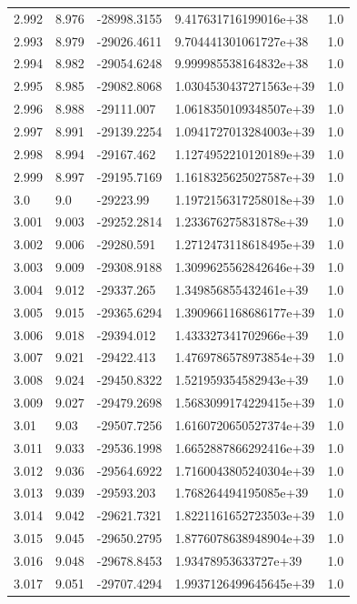 \begin{tabular}{lllll}
2.992 & 8.976 & -28998.3155 & 9.417631716199016e+38 & 1.0 \\
2.993 & 8.979 & -29026.4611 & 9.704441301061727e+38 & 1.0 \\
2.994 & 8.982 & -29054.6248 & 9.999985538164832e+38 & 1.0 \\
2.995 & 8.985 & -29082.8068 & 1.0304530437271563e+39 & 1.0 \\
2.996 & 8.988 & -29111.007 & 1.0618350109348507e+39 & 1.0 \\
2.997 & 8.991 & -29139.2254 & 1.0941727013284003e+39 & 1.0 \\
2.998 & 8.994 & -29167.462 & 1.1274952210120189e+39 & 1.0 \\
2.999 & 8.997 & -29195.7169 & 1.1618325625027587e+39 & 1.0 \\
3.0 & 9.0 & -29223.99 & 1.1972156317258018e+39 & 1.0 \\
3.001 & 9.003 & -29252.2814 & 1.233676275831878e+39 & 1.0 \\
3.002 & 9.006 & -29280.591 & 1.2712473118618495e+39 & 1.0 \\
3.003 & 9.009 & -29308.9188 & 1.3099625562842646e+39 & 1.0 \\
3.004 & 9.012 & -29337.265 & 1.349856855432461e+39 & 1.0 \\
3.005 & 9.015 & -29365.6294 & 1.3909661168686177e+39 & 1.0 \\
3.006 & 9.018 & -29394.012 & 1.433327341702966e+39 & 1.0 \\
3.007 & 9.021 & -29422.413 & 1.4769786578973854e+39 & 1.0 \\
3.008 & 9.024 & -29450.8322 & 1.521959354582943e+39 & 1.0 \\
3.009 & 9.027 & -29479.2698 & 1.5683099174229415e+39 & 1.0 \\
3.01 & 9.03 & -29507.7256 & 1.6160720650527374e+39 & 1.0 \\
3.011 & 9.033 & -29536.1998 & 1.6652887866292416e+39 & 1.0 \\
3.012 & 9.036 & -29564.6922 & 1.7160043805240304e+39 & 1.0 \\
3.013 & 9.039 & -29593.203 & 1.768264494195085e+39 & 1.0 \\
3.014 & 9.042 & -29621.7321 & 1.8221161652723503e+39 & 1.0 \\
3.015 & 9.045 & -29650.2795 & 1.8776078638948904e+39 & 1.0 \\
3.016 & 9.048 & -29678.8453 & 1.93478953633727e+39 & 1.0 \\
3.017 & 9.051 & -29707.4294 & 1.9937126499645645e+39 & 1.0 \\

\end{tabular}
